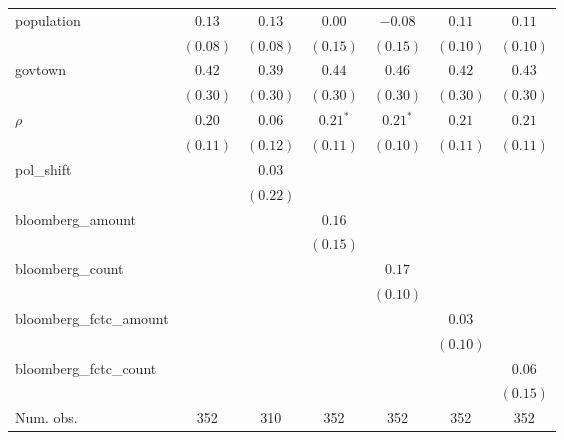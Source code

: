 \begin{table}[!h]
\begin{center}
\begin{tabular}{l c c c c c c }
population              & $0.13$       & $0.13$       & $0.00$       & $-0.08$      & $0.11$       & $0.11$       \\
                        & $(0.08)$     & $(0.08)$     & $(0.15)$     & $(0.15)$     & $(0.10)$     & $(0.10)$     \\
govtown                 & $0.42$       & $0.39$       & $0.44$       & $0.46$       & $0.42$       & $0.43$       \\
                        & $(0.30)$     & $(0.30)$     & $(0.30)$     & $(0.30)$     & $(0.30)$     & $(0.30)$     \\
$\rho$                  & $0.20$       & $0.06$       & $0.21^{*}$   & $0.21^{*}$   & $0.21$       & $0.21$       \\
                        & $(0.11)$     & $(0.12)$     & $(0.11)$     & $(0.10)$     & $(0.11)$     & $(0.11)$     \\
pol\_shift              &              & $0.03$       &              &              &              &              \\
                        &              & $(0.22)$     &              &              &              &              \\
bloomberg\_amount       &              &              & $0.16$       &              &              &              \\
                        &              &              & $(0.15)$     &              &              &              \\
bloomberg\_count        &              &              &              & $0.17$       &              &              \\
                        &              &              &              & $(0.10)$     &              &              \\
bloomberg\_fctc\_amount &              &              &              &              & $0.03$       &              \\
                        &              &              &              &              & $(0.10)$     &              \\
bloomberg\_fctc\_count  &              &              &              &              &              & $0.06$       \\
                        &              &              &              &              &              & $(0.15)$     \\
\midrule
Num. obs.               & 352          & 310          & 352          & 352          & 352          & 352          \\

\end{tabular}
\end{center}
\end{table}
